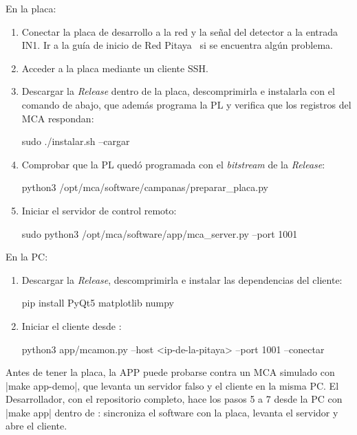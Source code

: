 En la placa:
\begin{enumerate}
  \item Conectar la placa de desarrollo a la red y la señal del detector a la
    entrada IN1. Ir a la guía de inicio de Red
    Pitaya~\cite{RedPitayaQuickStart} si se encuentra algún problema.
  \item Acceder a la placa mediante un cliente SSH.
  \item Descargar la \emph{Release} dentro de la placa, descomprimirla e instalarla con
    el comando de abajo, que además programa la PL y verifica que los
    registros del MCA respondan:
\begin{comando}
sudo ./instalar.sh --cargar
\end{comando}

  \item Comprobar que la PL quedó programada con el \emph{bitstream} de la \emph{Release}:
\begin{comando}
python3 /opt/mca/software/campanas/preparar_placa.py
\end{comando}

  \item Iniciar el servidor de control remoto:
\begin{comando}
sudo python3 /opt/mca/software/app/mca_server.py --port 1001
\end{comando}

\end{enumerate}

En la PC:
\begin{enumerate}[resume]
  \item Descargar la \emph{Release}, descomprimirla e instalar las dependencias del
    cliente:
\begin{comando}
pip install PyQt5 matplotlib numpy
\end{comando}

  \item Iniciar el cliente desde :
\begin{comando}
python3 app/mcamon.py --host <ip-de-la-pitaya> --port 1001 --conectar
\end{comando}

\end{enumerate}

\begin{sloppypar}
Antes de tener la placa, la APP puede probarse contra un MCA simulado con
\cmd|make app-demo|, que levanta un servidor falso y el cliente en la misma PC.
El Desarrollador, con el repositorio completo, hace los pasos 5 a 7 desde la PC
con \cmd|make app| dentro de : sincroniza el software con la
placa, levanta el servidor y abre el cliente.
\end{sloppypar}

